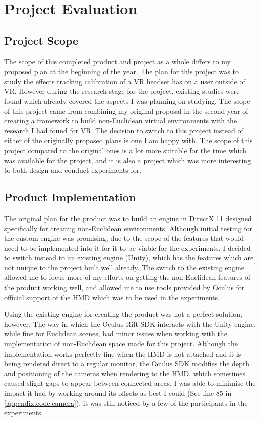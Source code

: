 \chapter{Project Evaluation}
\label{eval}

	\section[Scope]{Project Scope}

		The scope of this completed product and project as a whole differs to my proposed plan at the beginning of the year.
		The plan for this project was to study the effects tracking calibration of a VR headset has on a user outside of VR.
		However during the research stage for the project, existing studies were found which already covered the aspects I was planning on studying.
		The scope of this project came from combining my original proposal in the second year of creating a framework to build non-Euclidean virtual environments with the research I had found for VR.
		The decision to switch to this project instead of either of the originally proposed plans is one I am happy with.
		The scope of this project compared to the original ones is a lot more suitable for the time which was available for the project, and it is also a project which was more interesting to both design and conduct experiments for.

	\section[Implementation]{Product Implementation}

		The original plan for the product was to build an engine in DirectX 11 designed specifically for creating non-Euclidean environments.
		Although initial testing for the custom engine was promising, due to the scope of the features that would need to be implemented into it for it to be viable for the experiments, I decided to switch instead to an existing engine (Unity), which has the features which are not unique to the project built well already.
		The switch to the existing engine allowed me to focus more of my efforts on getting the non-Euclidean features of the product working well, and allowed me to use tools provided by Oculus for official support of the HMD which was to be used in the experiments.

		Using the existing engine for creating the product was not a perfect solution, however.
		The way in which the Oculus Rift SDK interacts with the Unity engine, while fine for Euclidean scenes, had minor issues when working with the implementation of non-Euclidean space made for this project.
		Although the implementation works perfectly fine when the HMD is not attached and it is being rendered direct to a regular monitor, the Oculus SDK modifies the depth and positioning of the cameras when rendering to the HMD, which sometimes caused slight gaps to appear between connected areas.
		I was able to minimise the impact it had by working around its offsets as best I could (See line 85 in \autoref{appendix:code:camera}), it was still noticed by a few of the participants in the experiments.

